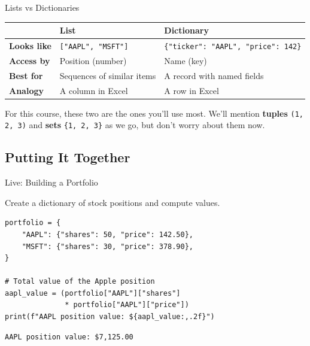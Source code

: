 \documentclass[9pt,aspectratio=169]{beamer}
\begin{document}
\begin{frame}{Lists vs Dictionaries}

\begin{tabular}{@{}lp{4.5cm}p{5.5cm}@{}}
\toprule
 & \textbf{List} & \textbf{Dictionary} \\
\midrule
\textbf{Looks like} & \texttt{["AAPL", "MSFT"]} & \texttt{\{"ticker": "AAPL", "price": 142\}} \\[0.5em]
\textbf{Access by} & Position (number) & Name (key) \\[0.5em]
\textbf{Best for} & Sequences of similar items & A record with named fields \\[0.5em]
\textbf{Analogy} & A column in Excel & A row in Excel \\
\bottomrule
\end{tabular}

\bigskip

For this course, these two are the ones you'll use most. We'll mention \textbf{tuples} \texttt{(1, 2, 3)} and \textbf{sets} \texttt{\{1, 2, 3\}} as we go, but don't worry about them now.

\end{frame}


\subsection{Putting It Together}
\begin{frame}[fragile]{Live: Building a Portfolio}

\begin{demobox}
Create a dictionary of stock positions and compute values.
\end{demobox}

\begin{lstlisting}
portfolio = {
    "AAPL": {"shares": 50, "price": 142.50},
    "MSFT": {"shares": 30, "price": 378.90},
}

# Total value of the Apple position
aapl_value = (portfolio["AAPL"]["shares"]
              * portfolio["AAPL"]["price"])
print(f"AAPL position value: ${aapl_value:,.2f}")
\end{lstlisting}

\begin{lstlisting}[style=output]
AAPL position value: $7,125.00
\end{lstlisting}

\end{frame}
\end{document}
